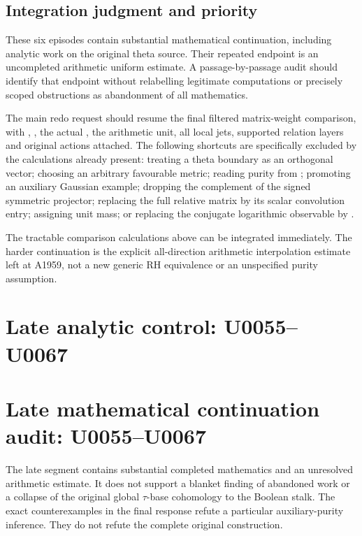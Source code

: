 \subsection{Integration judgment and
priority}\label{TranscriptLedgerStage:integration-judgment-and-priority}

These six episodes contain substantial mathematical continuation,
including analytic work on the original theta source. Their repeated
endpoint is an uncompleted arithmetic uniform estimate. A
passage-by-passage audit should identify that endpoint without
relabelling legitimate computations or precisely scoped obstructions as
abandonment of all mathematics.

The main redo request should resume the final filtered matrix-weight
comparison, with \protect{}, \protect{}, the actual
\protect{}, the arithmetic unit, all local jets, supported
relation layers and original actions attached. The following shortcuts
are specifically excluded by the calculations already present: treating
a theta boundary as an orthogonal vector; choosing an arbitrary
favourable metric; reading purity from \protect{}; promoting
an auxiliary Gaussian example; dropping the complement of the signed
symmetric projector; replacing the full relative matrix by its scalar
convolution entry; assigning unit mass; or replacing the conjugate
logarithmic observable by \protect{}.

The tractable comparison calculations above can be integrated
immediately. The harder continuation is the explicit all-direction
arithmetic interpolation estimate left at A1959, not a new generic RH
equivalence or an unspecified purity assumption.

\clearpage

\section{Late analytic control:
U0055--U0067}\label{TranscriptLedgerStage:late-analytic-control-u0055u0067}

\section{Late mathematical continuation audit:
U0055--U0067}\label{TranscriptLedgerStage:late-mathematical-continuation-audit-u0055u0067}

The late segment contains substantial completed mathematics and an
unresolved arithmetic estimate. It does not support a blanket finding of
abandoned work or a collapse of the original global
\allowbreak{}\ensuremath{τ}\allowbreak{}-base cohomology to the Boolean
stalk. The exact counterexamples in the final response refute a
particular auxiliary-purity inference. They do not refute the complete
original construction.

